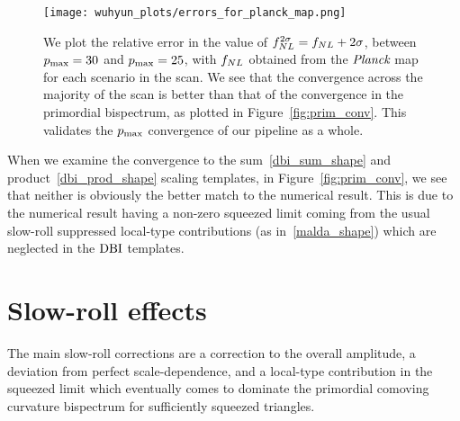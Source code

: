 \begin{figure}[h!]
\centering
\texttt{[image: wuhyun\_plots/errors\_for\_planck\_map.png]}
\caption{
    We plot the relative error in the value of $f_{NL}^{2\sigma}=f_{NL}+2\sigma$,
    between $p_\text{max}=30$ and $p_\text{max}=25$,
    with $f_{NL}$ obtained from the $\textit{Planck}$ map for each scenario in the scan.
    We see that the convergence across the majority of the scan is better than that of the
    convergence in the primordial bispectrum, as plotted in Figure~\ref{fig:prim_conv}.
    This validates the $p_\text{max}$ convergence of our pipeline as a whole.
}\label{fig:cmb_conv}
\end{figure}


    When we examine the convergence to the sum~\eqref{dbi_sum_shape}
    and product~\eqref{dbi_prod_shape} scaling templates,
    in Figure~\ref{fig:prim_conv},
    we see that neither is obviously the better match to the numerical result.
    This is due to the numerical result having a non-zero squeezed limit
    coming from the usual slow-roll suppressed local-type contributions
    (as in~\eqref{malda_shape}) which are neglected in the $\text{DBI}$ templates.




\section{Slow-roll effects}
    The main slow-roll corrections are a correction to the overall amplitude,
    a deviation from perfect scale-dependence,
    and a local-type contribution in the squeezed limit which eventually comes to dominate
    the primordial comoving curvature bispectrum
    for sufficiently squeezed triangles.


